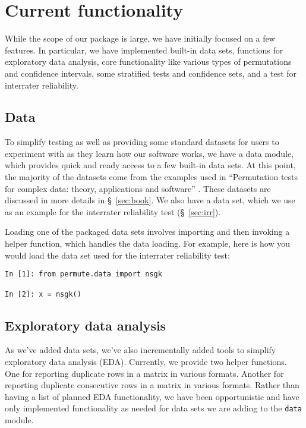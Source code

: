 \chapter{\label{ch:func}Current functionality}

While the scope of our package is large, we have initially focused on a
few features.  In particular, we have implemented built-in data sets,
functions for exploratory data analysis, core functionality like various
types of permutations and confidence intervals, some stratified tests
and confidence sets, and a test for interrater reliability.

\section{Data}

To simplify testing as well as providing some standard datasets for
users to experiment with as they learn how our software works, we
have a data module, which provides quick and ready access to a few
built-in data sets. At this point, the majority of the datasets come
from the examples used in ``Permutation tests for complex data: theory,
applications and software'' \cite{pesarin2010permutation}.  These
datasets are discussed in more details in \S~\ref{sec:book}.  We also
have a data set, which we use as an example for the interrater
reliability test (\S~\ref{sec:irr}).

Loading one of the packaged data sets involves importing and then
invoking a helper function, which handles the data loading.  For
example, here is how you would load the data set used for the
interrater reliability test:
\begin{verbatim}
In [1]: from permute.data import nsgk

In [2]: x = nsgk()
\end{verbatim} 

\section{Exploratory data analysis}

As we've added data sets, we've also incrementally added tools to simplify
exploratory data analysis (EDA).  Currently, we provide two helper functions.
One for reporting duplicate rows in a matrix in various formats.  Another for
reporting duplicate consecutive rows in a matrix in various formats.  Rather
than having a list of planned EDA functionality, we have been opportunistic
and have only implemented functionality as needed for data sets we are adding
to the \texttt{data} module.

